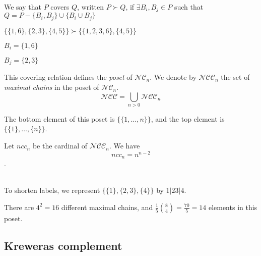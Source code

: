 \begin{definition}[$\succ$]
    We say that $P$ covers $Q$, written $P \succ Q$,
    if $\exists B_i, B_j \in P$ such that
    $Q = P - \{B_i, B_j\} \cup \{B_i \cup B_j\}$    
\end{definition}

\begin{example}
    $\{\{1, 6\}, \{2, 3\}, \{4, 5\}\} \succ
    \{\{1, 2, 3, 6\}, \{4, 5\}\}$\\
    \begin{itemize*}
        \item $B_i = \{1, 6\}$\\
        \item $B_j = \{2, 3\}$\\
    \end{itemize*}
\end{example}

\begin{prop}
    This covering relation defines the \emph{poset}
    of $\mathcal{NC}_n$.
    We denote by $\mathcal{NCC}_n$ the set of
    \emph{maximal chains} in the poset of $\mathcal{NC}_n$.\\
    $$\mathcal{NCC} = \bigcup_{n > 0}{\mathcal{NCC}_n}$$
\end{prop}

\begin{rem}
    The bottom element of this poset is $\{\{1, \ldots, n\}\}$,
    and the top element is $\{\{1\}, \ldots, \{n\}\}$.
\end{rem}

\begin{theorem}
    Let $ncc_n$ be the cardinal of $\mathcal{NCC}_n$.
    We have $$ncc_n = n^{n - 2}$$.
\end{theorem}

\begin{example}
    ~\\
    To shorten labels, we represent $\{\{1\}, \{2, 3\},
    \{4\}\}$ by $1|23|4$. \\

    \begin{center}
        
        There are $4^2 = 16$ different maximal chains,
        and $\frac {1}{5} \binom{8}{4} = \frac{70}{5} = 14$
        elements in this poset.
    \end{center}
\end{example}


\subsection{Kreweras complement}

